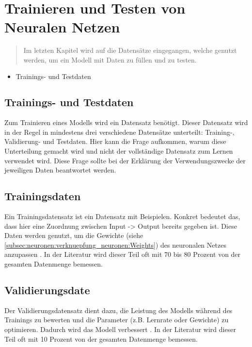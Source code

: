 \newpage
\thispagestyle{empty}
\section{Trainieren und Testen von Neuralen Netzen}\label{sec:trainierentesten}   
\begin{tcolorbox}[title={Inhalte von \textit{Trainings- und Testdaten}}]
  \begin{quotation}\noindent
    Im letzten Kapitel wird auf die Datensätze eingegangen, welche genutzt werden, um ein Modell mit Daten zu füllen und zu testen.
  \end{quotation}
  \begin{itemize}
    \item Trainings- und Testdaten
  \end{itemize}
\end{tcolorbox}

\subsection{Trainings- und Testdaten}\label{subsecsec:trainierentesten:daten}   
Zum Trainieren eines Modells wird ein Datensatz benötigt. Dieser Datensatz wird in der Regel in mindestens drei verschiedene Datensätze unterteilt: Training-, Validierung- und Testdaten.
Hier kann die Frage aufkommen, warum diese Unterteilung gemacht wird und nicht der vollständige Datensatz zum Lernen verwendet wird. 
Diese Frage sollte bei der Erklärung der Verwendungszwecke der jeweiligen Daten beantwortet werden.

\subsection{Trainingsdaten}
Ein Trainingsdatensatz ist ein Datensatz mit Beispielen. Konkret bedeutet das, dass hier eine Zuordnung zwischen Input -> Output bereits gegeben ist.
Diese Daten werden genutzt, um die Gewichte (siehe \ref*{subsec:neuronen:verknuepfung_neuronen:Weights}) des neuronalen Netzes anzupassen \cite[Seite 2ff]{CA18}.
In der Literatur wird dieser Teil oft mit 70 bis 80 Prozent von der gesamten Datenmenge bemessen.

\subsection{Validierungsdate}
Der Validierungsdatensatz dient dazu, die Leistung des Modells während des Trainings zu bewerten und die Parameter (z.B. Lernrate oder Gewichte) zu optimieren. 
Dadurch wird das Modell verbessert \cite[Seite 20]{CA18}.
In der Literatur wird dieser Teil oft mit 10 Prozent von der gesamten Datenmenge bemessen.

